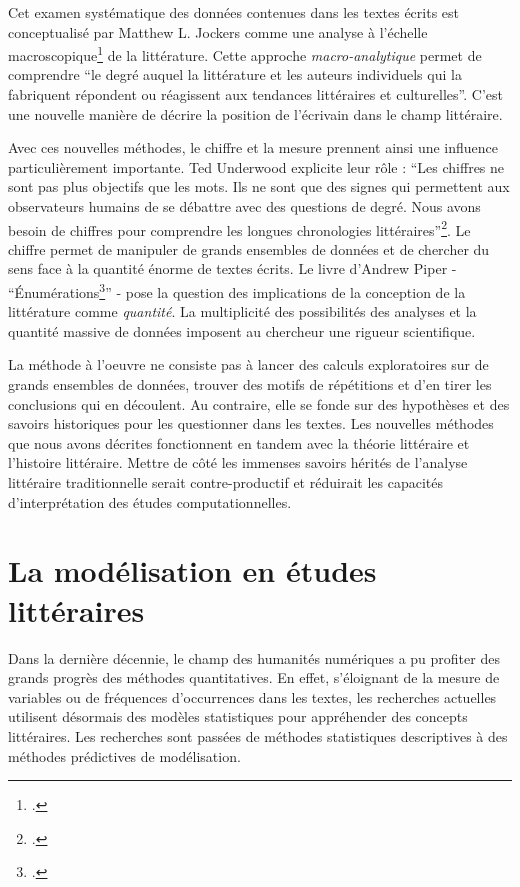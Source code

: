 Cet examen systématique des données contenues dans les textes écrits est conceptualisé par Matthew L. Jockers comme une analyse à l'échelle macroscopique\footcites{jockers_macroanalysis_2013} de la littérature. Cette approche \textit{macro-analytique} permet de comprendre \enquote{le degré auquel la littérature et les auteurs individuels qui la fabriquent répondent ou réagissent aux tendances littéraires et culturelles}. C'est une nouvelle manière de décrire la position de l'écrivain dans le champ littéraire. 

Avec ces nouvelles méthodes, le chiffre et la mesure prennent ainsi une influence particulièrement importante. Ted Underwood explicite leur rôle : \enquote{Les chiffres ne sont pas plus objectifs que les mots. Ils ne sont que des signes qui permettent aux observateurs humains de se débattre avec des questions de degré. Nous avons besoin de chiffres pour comprendre les longues chronologies littéraires}\footcites{underwood_why_2018}. Le chiffre permet de manipuler de grands ensembles de données et de chercher du sens face à la quantité énorme de textes écrits. Le livre d'Andrew Piper - \enquote{Énumérations\footcites{piper_enumerations_2018}} - pose la question des implications de la conception de la littérature comme \textit{quantité}. La multiplicité des possibilités des analyses et la quantité massive de données imposent au chercheur une rigueur scientifique.

La méthode à l'oeuvre ne consiste pas à lancer des calculs exploratoires sur de grands ensembles de données, trouver des motifs de répétitions et d'en tirer les conclusions qui en découlent. Au contraire, elle se fonde sur des hypothèses et des savoirs historiques pour les questionner dans les textes. Les nouvelles méthodes que nous avons décrites fonctionnent en tandem avec la théorie littéraire et l'histoire littéraire. Mettre de côté les immenses savoirs hérités de l'analyse littéraire traditionnelle serait contre-productif et réduirait les capacités d'interprétation des études computationnelles. 

\section{La modélisation en études littéraires}

Dans la dernière décennie, le champ des humanités numériques a pu profiter des grands progrès des méthodes quantitatives. En effet, s'éloignant de la mesure de variables ou de fréquences d'occurrences dans les textes, les recherches actuelles utilisent désormais des modèles statistiques pour appréhender des concepts littéraires. Les recherches sont passées de méthodes statistiques descriptives à des méthodes prédictives de modélisation.

